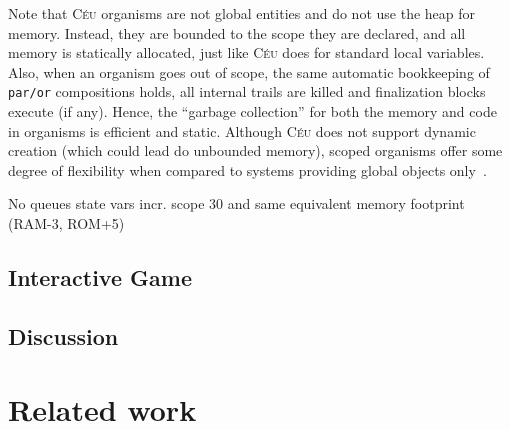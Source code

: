 \documentclass{sigplanconf}
\newcommand{\CEU}{\textsc{C\'{e}u}\xspace}
\newcommand{\code}[1] {{\small{\texttt{#1}}}}
\newcommand{\1}{\;}
\newcommand{\2}{\;\;}
\newcommand{\3}{\;\;\;}
\newcommand{\5}{\;\;\;\;\;}
\begin{document}
Note that \CEU organisms are not global entities and do not use the heap for 
memory.
Instead, they are bounded to the scope they are declared, and all memory is 
statically allocated, just like \CEU does for standard local variables.
Also, when an organism goes out of scope, the same automatic bookkeeping of 
\code{par/or} compositions holds, all internal trails are killed and 
finalization blocks execute (if any).
Hence, the ``garbage collection'' for both the memory and code in organisms is 
efficient and static.
Although \CEU does not support dynamic creation (which could lead do unbounded 
memory), scoped organisms offer some degree of flexibility when compared to 
systems providing global objects only~\cite{wsn.virgil,wsn.flowtalk}.

No queues
state vars
incr. scope
30%
and same equivalent memory footprint (RAM-3, ROM+5)


\subsection{Interactive Game}
\subsection{Discussion}

\section{Related work}
\label{sec.related}

\end{document}
